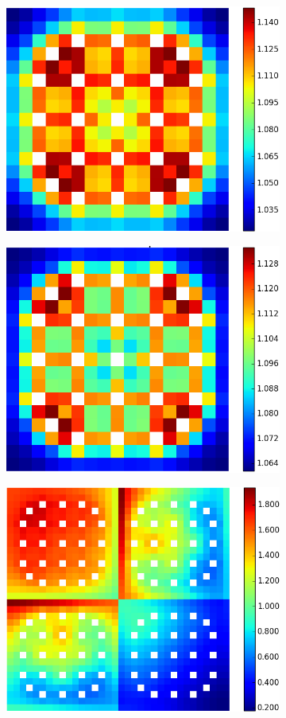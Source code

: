 \begin{figure}[h!]
\centering
\begin{subfigure}{0.4\textwidth}
  \centering
  \includegraphics[width=0.8\linewidth]{figures/assembly/fission-rates}
  \caption{}
  \label{fig:fiss-assm}
\end{subfigure}%
\begin{subfigure}{0.4\textwidth}
  \centering
  \includegraphics[width=0.8\linewidth]{figures/assembly/capture-rates}
  \caption{}
  \label{fig:capt-assm}
\end{subfigure}
\begin{subfigure}{0.4\textwidth}
  \centering
  \includegraphics[width=0.8\linewidth]{figures/reflector/fission-rates}

\end{subfigure}
\end{figure}
